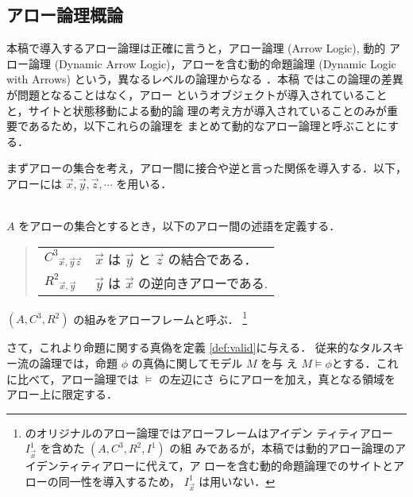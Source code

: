 \subsection{アロー論理概論}\label{subsec:al}
本稿で導入するアロー論理は正確に言うと，アロー論理 (Arrow Logic), 動的
アロー論理 (Dynamic Arrow Logic)，アローを含む動的命題論理 (Dynamic
Logic with Arrows) という，異なるレベルの論理からなる \cite{Benthem94}．本稿
ではこの論理の差異が問題となることはなく，アロー 
というオブジェクトが導入されていることと，サイトと状態移動による動的論
理の考え方が導入されていることのみが重要であるため，以下これらの論理を
まとめて動的なアロー論理と呼ぶことにする．

まずアローの集合を考え，アロー間に接合や逆と言った関係を導入する．以下，
アローには ${\vec x},{\vec y},{\vec z},\cdots$ を用いる．
\begin{my-def}[アローフレーム]\label{def:frame}~\\
$A$ をアローの集合とするとき，以下のアロー間の述語を定義する．
\begin{quote}
\begin{tabular}[b]{ll}
${C^{3}}_{{\vec x},{\vec y}{\vec z}}$ & $\vec x$ は $\vec
y$ と $\vec z$ の結合である．\\
${R^{2}}_{{\vec x},{\vec y}}$ & $\vec y$ は $\vec x$ の逆向きアローである.\\
\end{tabular}
\end{quote}
$(A, C^{3},R^{2})$ の組みをアローフレームと呼ぶ．
 \footnote{\cite{Benthem94}
 のオリジナルのアロー論理ではアローフレームはアイデン
ティティアロー $I^{1}_{\vec x}$ を含めた $(A, C^{3},R^{2},I^{1})$ の組
みであるが，本稿では動的アロー論理のアイデンティティアローに代えて，ア
ローを含む動的命題論理でのサイトとアローの同一性を導入するため，
$I^{1}_{\vec x}$ は用いない．}
\end{my-def}
さて，これより命題に関する真偽を定義 \ref{def:valid}に与える．
従来的なタルスキー流の論理では，命題 $\phi$ の真偽に関してモデル $M$ を与
え $M \models \phi$とする．これに比べて，アロー論理では $\models$ の左辺にさ
らにアローを加え，真となる領域をアロー上に限定する．

